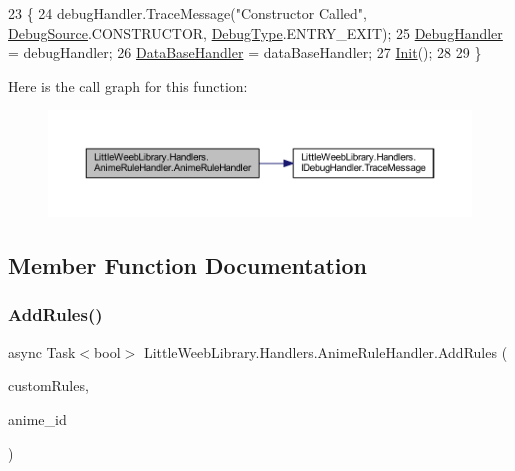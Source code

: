 \begin{DoxyCode}
23         \{
24             debugHandler.TraceMessage(\textcolor{stringliteral}{"Constructor Called"}, \mbox{\hyperlink{namespace_little_weeb_library_1_1_handlers_a2a6ca0775121c9c503d58aa254d292be}{DebugSource}}.CONSTRUCTOR, 
      \mbox{\hyperlink{namespace_little_weeb_library_1_1_handlers_ab66019ed40462876ec4e61bb3ccb0a62}{DebugType}}.ENTRY\_EXIT);
25             \mbox{\hyperlink{class_little_weeb_library_1_1_handlers_1_1_anime_rule_handler_a6ad89134d97d818f3b2deebb7e2cf361}{DebugHandler}} = debugHandler;
26             \mbox{\hyperlink{class_little_weeb_library_1_1_handlers_1_1_anime_rule_handler_a31322132913e3f4b669e14a3e621a326}{DataBaseHandler}} = dataBaseHandler;
27             \mbox{\hyperlink{class_little_weeb_library_1_1_handlers_1_1_anime_rule_handler_a719277ca087cc0e4b46708179d62b07f}{Init}}();
28 
29         \}
\end{DoxyCode}
Here is the call graph for this function\+:\nopagebreak
\begin{figure}[H]
\begin{center}
\leavevmode
\includegraphics[width=350pt]{class_little_weeb_library_1_1_handlers_1_1_anime_rule_handler_a71cb7aa9d7e5df35ae28ac4fcb11a51f_cgraph}
\end{center}
\end{figure}


\subsection{Member Function Documentation}
\mbox{\label{class_little_weeb_library_1_1_handlers_1_1_anime_rule_handler_a469232c6b73d0ceff935c4ef2d78d039}} 
\subsubsection{\texorpdfstring{Add\+Rules()}{AddRules()}}
{\footnotesize\ttfamily async Task$<$bool$>$ Little\+Weeb\+Library.\+Handlers.\+Anime\+Rule\+Handler.\+Add\+Rules (\begin{DoxyParamCaption}\item[{J\+Object}]{custom\+Rules,  }\item[{string}]{anime\+\_\+id }\end{DoxyParamCaption})}



